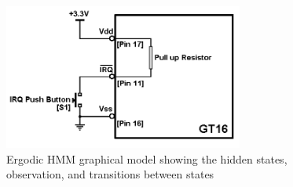 \begin{figure}[ht]
	\centering
	\includegraphics[width=0.7\textwidth]{model.png}
	\caption{Ergodic HMM graphical model showing the hidden states, observation, and transitions between states}
	\label{fig:model}
\end{figure}

